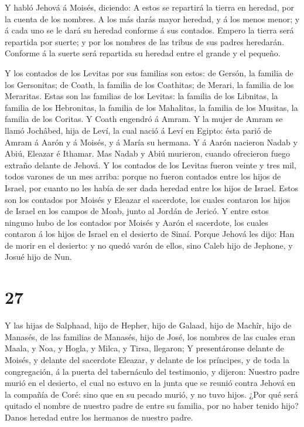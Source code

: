  Y habló Jehová á Moisés, diciendo:  A estos
se repartirá la tierra en heredad, por la cuenta de los nombres.
 A los más darás mayor heredad, y á los menos menor; y á
cada uno se le dará su heredad conforme á sus contados. 
Empero la tierra será repartida por suerte; y por los nombres de las
tribus de sus padres heredarán.  Conforme á la suerte será
repartida su heredad entre el grande y el pequeño.

 Y los contados de los Levitas por sus familias son estos:
de Gersón, la familia de los Gersonitas; de Coath, la familia de los
Coathitas; de Merari, la familia de los Meraritas.  Estas
son las familias de los Levitas: la familia de los Libnitas, la familia
de los Hebronitas, la familia de los Mahalitas, la familia de los
Musitas, la familia de los Coritas. Y Coath engendró á Amram.
 Y la mujer de Amram se llamó Jochâbed, hija de Leví, la
cual nació á Leví en Egipto: ésta parió de Amram á Aarón y á Moisés, y á
María su hermana.  Y á Aarón nacieron Nadab y Abiú, Eleazar
é Ithamar.  Mas Nadab y Abiú murieron, cuando ofrecieron
fuego extraño delante de Jehová.  Y los contados de los
Levitas fueron veinte y tres mil, todos varones de un mes arriba: porque
no fueron contados entre los hijos de Israel, por cuanto no les había de
ser dada heredad entre los hijos de Israel.  Estos son los
contados por Moisés y Eleazar el sacerdote, los cuales contaron los
hijos de Israel en los campos de Moab, junto al Jordán de Jericó.
 Y entre estos ninguno hubo de los contados por Moisés y
Aarón el sacerdote, los cuales contaron á los hijos de Israel en el
desierto de Sinaí.  Porque Jehová les dijo: Han de morir en
el desierto: y no quedó varón de ellos, sino Caleb hijo de Jephone, y
Josué hijo de Nun.

\hypertarget{section-26}{%
\section{27}\label{section-26}}

 Y las hijas de Salphaad, hijo de Hepher, hijo de Galaad,
hijo de Machîr, hijo de Manasés, de las familias de Manasés, hijo de
José, los nombres de las cuales eran Maala, y Noa, y Hogla, y Milca, y
Tirsa, llegaron;  Y presentáronse delante de Moisés, y
delante del sacerdote Eleazar, y delante de los príncipes, y de toda la
congregación, á la puerta del tabernáculo del testimonio, y dijeron:
 Nuestro padre murió en el desierto, el cual no estuvo en la
junta que se reunió contra Jehová en la compañía de Coré: sino que en su
pecado murió, y no tuvo hijos.  ¿Por qué será quitado el
nombre de nuestro padre de entre su familia, por no haber tenido hijo?
Danos heredad entre los hermanos de nuestro padre.

